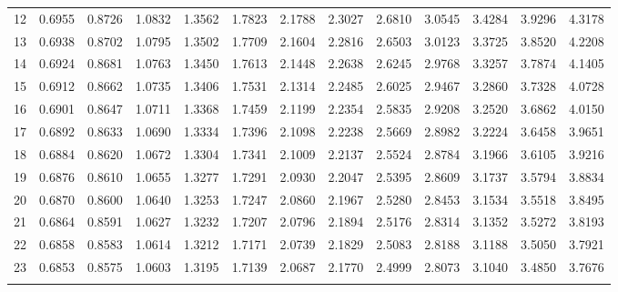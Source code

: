 {\begin{tabular}{m{6pt}|m{24pt}*{11}{m{24pt}}}
 12 & 0.6955 & 0.8726 & 1.0832 & 1.3562 & 1.7823 & 2.1788 & 2.3027 & 2.6810 & 3.0545 & 3.4284 & 3.9296 & 4.3178 \\[1pt] \arrayrulecolor{light-gray}\hline\arrayrulecolor{black}  
 13 & 0.6938 & 0.8702 & 1.0795 & 1.3502 & 1.7709 & 2.1604 & 2.2816 & 2.6503 & 3.0123 & 3.3725 & 3.8520 & 4.2208 \\[1pt] \arrayrulecolor{light-gray}\hline\arrayrulecolor{black}  
 14 & 0.6924 & 0.8681 & 1.0763 & 1.3450 & 1.7613 & 2.1448 & 2.2638 & 2.6245 & 2.9768 & 3.3257 & 3.7874 & 4.1405 \\[1pt] \arrayrulecolor{light-gray}\hline\arrayrulecolor{black}  
 15 & 0.6912 & 0.8662 & 1.0735 & 1.3406 & 1.7531 & 2.1314 & 2.2485 & 2.6025 & 2.9467 & 3.2860 & 3.7328 & 4.0728 \\[1pt] \arrayrulecolor{light-gray}\hline\arrayrulecolor{black}  
 16 & 0.6901 & 0.8647 & 1.0711 & 1.3368 & 1.7459 & 2.1199 & 2.2354 & 2.5835 & 2.9208 & 3.2520 & 3.6862 & 4.0150 \\[1pt] \arrayrulecolor{light-gray}\hline\arrayrulecolor{black}  
 17 & 0.6892 & 0.8633 & 1.0690 & 1.3334 & 1.7396 & 2.1098 & 2.2238 & 2.5669 & 2.8982 & 3.2224 & 3.6458 & 3.9651 \\[1pt] \arrayrulecolor{light-gray}\hline\arrayrulecolor{black}  
 18 & 0.6884 & 0.8620 & 1.0672 & 1.3304 & 1.7341 & 2.1009 & 2.2137 & 2.5524 & 2.8784 & 3.1966 & 3.6105 & 3.9216 \\[1pt] \arrayrulecolor{light-gray}\hline\arrayrulecolor{black}  
 19 & 0.6876 & 0.8610 & 1.0655 & 1.3277 & 1.7291 & 2.0930 & 2.2047 & 2.5395 & 2.8609 & 3.1737 & 3.5794 & 3.8834 \\[1pt] \arrayrulecolor{light-gray}\hline\arrayrulecolor{black}  
 20 & 0.6870 & 0.8600 & 1.0640 & 1.3253 & 1.7247 & 2.0860 & 2.1967 & 2.5280 & 2.8453 & 3.1534 & 3.5518 & 3.8495 \\[1pt] \arrayrulecolor{light-gray}\hline\arrayrulecolor{black}  
 21 & 0.6864 & 0.8591 & 1.0627 & 1.3232 & 1.7207 & 2.0796 & 2.1894 & 2.5176 & 2.8314 & 3.1352 & 3.5272 & 3.8193 \\[1pt] \arrayrulecolor{light-gray}\hline\arrayrulecolor{black}  
 22 & 0.6858 & 0.8583 & 1.0614 & 1.3212 & 1.7171 & 2.0739 & 2.1829 & 2.5083 & 2.8188 & 3.1188 & 3.5050 & 3.7921 \\[1pt] \arrayrulecolor{light-gray}\hline\arrayrulecolor{black}  
 23 & 0.6853 & 0.8575 & 1.0603 & 1.3195 & 1.7139 & 2.0687 & 2.1770 & 2.4999 & 2.8073 & 3.1040 & 3.4850 & 3.7676 \\[1pt] \arrayrulecolor{light-gray}\hline\arrayrulecolor{black}  

\end{tabular}}
